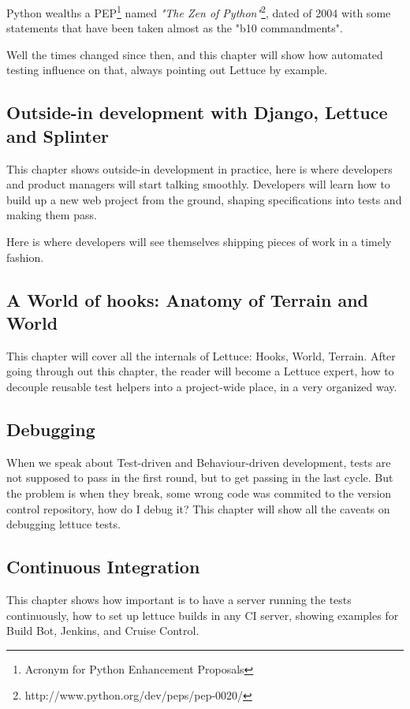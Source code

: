 \documentclass[letterpaper]{article}
\begin{document}
\noindent
Python wealths a PEP\footnote{Acronym for Python Enhancement Proposals} named \textit{"The Zen of Python"}\footnote{http://www.python.org/dev/peps/pep-0020/}, dated of 2004 with some statements that have been taken almost as the "b10 commandments".

\noindent
Well the times changed since then, and this chapter will show how
automated testing influence on that, always pointing out Lettuce by
example.

\subsection*{Outside-in development with Django, Lettuce and Splinter}
\noindent
This chapter shows outside-in development in practice, here is where
developers and product managers will start talking smoothly.
Developers will learn how to build up a new web project from the
ground, shaping specifications into tests and making them pass.

\noindent
Here is where developers will see themselves shipping pieces of work in a timely fashion.

\subsection*{A World of hooks: Anatomy of Terrain and World}
\noindent
This chapter will cover all the internals of Lettuce: Hooks, World,
Terrain.  After going through out this chapter, the reader will become
a Lettuce expert, how to decouple reusable test helpers into a
project-wide place, in a very organized way.

\subsection*{Debugging}
\noindent
When we speak about Test-driven and Behaviour-driven development,
tests are not supposed to pass in the first round, but to get passing
in the last cycle.
\noindent
But the problem is when they break, some wrong code was commited to
the version control repository, how do I debug it?
\noindent
This chapter will show all the caveats on debugging lettuce tests.
\subsection*{Continuous Integration}
\noindent
This chapter shows how important is to have a server running the tests
continuously, how to set up lettuce builds in any CI server, showing
examples for Build Bot, Jenkins, and Cruise Control.
\end{document}

